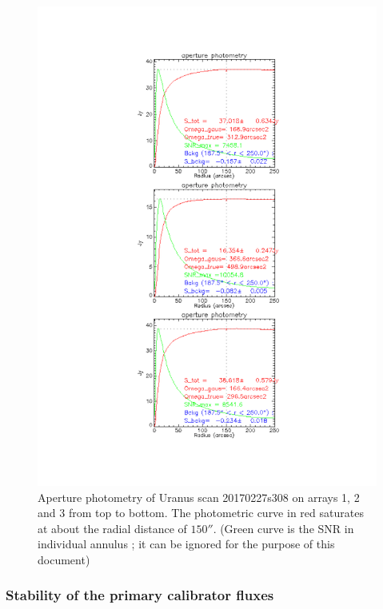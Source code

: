 \begin{figure}[p]
\begin{center}
  \includegraphics[clip, angle=0, scale=0.7]{Figures/Uranus_s308.pdf}
  \caption[Aperture photometry examples]{Aperture photometry of Uranus  scan 20170227s308  on arrays 1, 2 and 3 from top to bottom.
    The photometric curve in red saturates at about the radial
    distance of  $150''$. (Green curve is the SNR in individual
    annulus ; it can be ignored for the purpose of this document)}
\label{fig:PhAp}
\end{center}
\end{figure}


\subsubsection{Stability of the primary calibrator fluxes}

